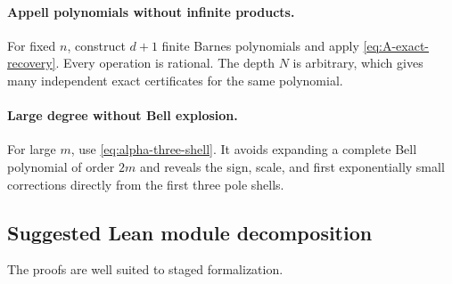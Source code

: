 \documentclass[11pt,oneside]{article}
\theoremstyle{frontier}
\theoremstyle{definition}
\theoremstyle{remark}
\begin{document}
\paragraph{Appell polynomials without infinite products.}
For fixed $n$, construct $d+1$ finite Barnes polynomials and apply
\eqref{eq:A-exact-recovery}.  Every operation is rational.  The depth $N$ is arbitrary, which gives
many independent exact certificates for the same polynomial.

\paragraph{Large degree without Bell explosion.}
For large $m$, use \eqref{eq:alpha-three-shell}.  It avoids expanding a complete Bell polynomial of
order $2m$ and reveals the sign, scale, and first exponentially small corrections directly from the
first three pole shells.

\subsection{Suggested Lean module decomposition}

The proofs are well suited to staged formalization.
\end{document}
